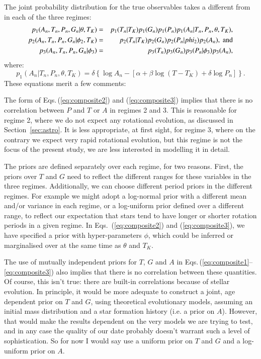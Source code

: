 \documentclass[11pt,a4paper]{article}
\newenvironment{packed_item}{
\begin{itemize}
\setlength{\itemsep}{1pt}
\setlength{\parskip}{0pt}
\setlength{\parsep}{0pt}
}{\end{itemize}}
\begin{document}
The joint probability distribution for the true observables takes a
different from in each of the three regimes:
\begin{eqnarray}
p_1(A_n,T_n,P_n,G_n|\theta,T_K) & = & p_1(T_n|T_K) p_1(G_n) p_1(P_n) p_1(A_n|T_n,P_n,\theta,T_K), \label{eq:composite1} \\
p_2(A_n,T_n,P_n,G_n|\phi_2,T_K) & = & p_2(T_n|T_K) p_2(G_n) p_2(P_n|phi_2) p_2(A_n),~{\rm and}\label{eq:composite2} \\
p_3(A_n,T_n,P_n,G_n|\phi_3) & = & p_3(T_n) p_3(G_n) p_3(P_n|\phi_3) p_3(A_n)\label{eq:composite3},
\end{eqnarray}
where:
\begin{equation}
p_1(A_n|T_n,P_n,\theta,T_K) = \delta \left\{ \log A_n - \left[ \alpha+ \beta \log \left(T-T_K \right) + \delta \log P_n \right] \right\}.
\end{equation}
These equations merit a few comments:
\begin{packed_item}
\item The form of Eqs.\,(\ref{eq:composite2}) and
  (\ref{eq:composite3}) implies that there is no correlation between
  $P$ and $T$ or $A$ in regimes 2 and 3. This is reasonable for regime
  2, where we do not expect any rotational evolution, as discussed in
  Section~\ref{sec:astro}.  It is less appropriate, at first sight,
  for regime 3, where on the contrary we expect very rapid rotational
  evolution, but this regime is not the focus of the present study, we
  are less interested in modelling it in detail.
\item The priors are defined separately over each regime, for two
  reasons. First, the priors over $T$ and $G$ need to reflect the
  different ranges for these variables in the three
  regimes. Additionally, we can choose different period priors in the
  different regimes. For example we might adopt a log-normal prior
  with a different mean and/or variance in each regime, or a
  log-uniform prior defined over a different range, to reflect our
  expectation that stars tend to have longer or shorter rotation
  periods in a given regime. In Eqs.~(\ref{eq:composite2}) and
  (\ref{eq:composite3}), we have specified a prior with
  hyper-parameters $\phi$, which could be inferred or marginalised
  over at the same time as $\theta$ and $T_K$.
\item The use of mutually independent priors for $T$, $G$ and $A$ in
  Eqs.\,(\ref{eq:composite1}--\ref{eq:composite3}) also implies that
  there is no correlation between these quantities. Of course, this
  isn't true: there are built-in correlations because of stellar
  evolution. In principle, it would be more adequate to construct a
  joint, age dependent prior on $T$ and $G$, using theoretical
  evolutionary models, assuming an initial mass distribution and a
  star formation history (i.e. a prior on $A$). However, that would
  make the results dependent on the very models we are trying to test,
  and in any case the quality of our date probably doesn't warrant
  such a level of sophistication. So for now I would say use a uniform
  prior on $T$ and $G$ and a log-uniform prior on $A$.
\end{packed_item}
\end{document}
